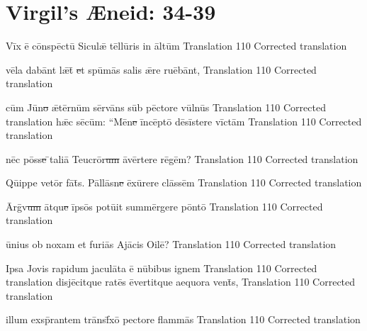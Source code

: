 \documentclass[]{article}
\begin{document}
\section*{Virgil's {\AE}neid:  34-39} %


\latline
  {V\=ix \={\macron e} c\={\macron o}nsp\=ect\={\macron u} S\-ic\-ul\={\ae} t\=ell\={\macron u}r\-is \-in \=alt\=um }
  {Translation}
  {110} %
  {Corrected translation}
  {
  }

\latline
  {v\={\macron e}l\-a d\-ab\=ant l\={\ae}t\={\macron{\i}}\sout{ e}t sp\={\macron u}m\={\macron a}s s\-al\-is \={\ae}r\-e r\-u\={\macron e}b\=ant,}
  {Translation}
  {110} %
  {Corrected translation}
  {
  }

\latline
  {c\=um J\={\macron u}n\sout{o }\={\ae}t\=ern\=um s\=erv\={\macron a}ns s\=ub p\=ect\-or\-e v\=uln\={\macron u}s}
  {Translation}
  {110} %
  {Corrected translation}
  {
  }
\newpage
\latline
  {h\={\ae}c s\={\macron e}c\=um:  ``M\={\macron e}n\sout{e }\=inc\=ept\={\macron o} d\={\macron e}s\=ist\-er\-e v\=ict\=am}
  {Translation}
  {110} %
  {Corrected translation}
  {
  }

\latline
  {n\=ec p\=oss\sout{e }\={}t\-al\-i\={\macron a} T\-e\-ucr\={\macron o}r\sout{um }\={\macron a}v\=ert\-er\-e r\={\macron e}g\=em?}
  {Translation}
  {110} %
  {Corrected translation}
  {
  }

\latline
  {Q\={ui}pp\-e v\-et\=or f\={\macron a}t\={\macron{\i}}s.  P\=all\=asn\sout{e }\=ex\={\macron u}r\-er\-e cl\=ass\=em}
  {Translation}
  {110} %
  {Corrected translation}
  {
  }

\newpage

\latline
  {\=Arg\={\macron{\i}}v\sout{um }\=atqu\sout{e }\=ips\={\macron o}s pot\={ui}t s\-umm\=erg\-er\-e p\=ont\={\macron o}}
  {Translation}
  {110} %
  {Corrected translation}
  {
  }

\latline
  {\={\macron u}nius ob noxam et furi\={\macron a}s Aj\={\macron a}cis Oile\={\macron{\i}}?}
  {Translation}
  {110} %
  {Corrected translation}
  {
  }

\latline
  {Ipsa Jovis rapidum jacul\={\macron a}ta \={\macron e} n\={\macron u}bibus ignem}
  {Translation}
  {110} %
  {Corrected translation}
  {
  }
\newpage
\latline
  {disj\={\macron e}citque rat\={\macron e}s \={\macron e}vertitque aequora vent\={\macron{\i}}s,}
  {Translation}
  {110} %
  {Corrected translation}
  {
  }

\latline
  {illum exsp\={\macron{\i}}rantem tr\={\macron a}nsf\={\macron{\i}}x\={\macron o} pectore flamm\={\macron a}s}
  {Translation}
  {110} %
  {Corrected translation}
  {
  }
\end{document}
